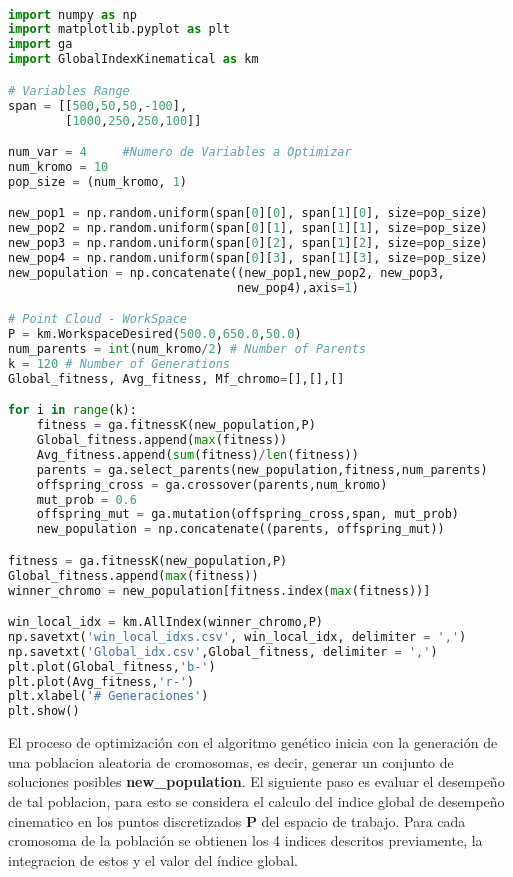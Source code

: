 ~
\begin{lstlisting}[frame=single,language = python]  % Start your code-block
import numpy as np
import matplotlib.pyplot as plt
import ga
import GlobalIndexKinematical as km

# Variables Range
span = [[500,50,50,-100],
        [1000,250,250,100]]

num_var = 4     #Numero de Variables a Optimizar
num_kromo = 10
pop_size = (num_kromo, 1)

new_pop1 = np.random.uniform(span[0][0], span[1][0], size=pop_size)
new_pop2 = np.random.uniform(span[0][1], span[1][1], size=pop_size)
new_pop3 = np.random.uniform(span[0][2], span[1][2], size=pop_size)
new_pop4 = np.random.uniform(span[0][3], span[1][3], size=pop_size)
new_population = np.concatenate((new_pop1,new_pop2, new_pop3,
                                new_pop4),axis=1)

# Point Cloud - WorkSpace
P = km.WorkspaceDesired(500.0,650.0,50.0)
num_parents = int(num_kromo/2) # Number of Parents
k = 120 # Number of Generations
Global_fitness, Avg_fitness, Mf_chromo=[],[],[]

for i in range(k):
    fitness = ga.fitnessK(new_population,P)
    Global_fitness.append(max(fitness))
    Avg_fitness.append(sum(fitness)/len(fitness))
    parents = ga.select_parents(new_population,fitness,num_parents)
    offspring_cross = ga.crossover(parents,num_kromo)
    mut_prob = 0.6
    offspring_mut = ga.mutation(offspring_cross,span, mut_prob)
    new_population = np.concatenate((parents, offspring_mut))

fitness = ga.fitnessK(new_population,P)
Global_fitness.append(max(fitness))
winner_chromo = new_population[fitness.index(max(fitness))]

win_local_idx = km.AllIndex(winner_chromo,P)
np.savetxt('win_local_idxs.csv', win_local_idx, delimiter = ',')
np.savetxt('Global_idx.csv',Global_fitness, delimiter = ',')
plt.plot(Global_fitness,'b-')
plt.plot(Avg_fitness,'r-')
plt.xlabel('# Generaciones')
plt.show()
\end{lstlisting}

El proceso de optimización con el algoritmo genético inicia con la generación de una poblacion aleatoria de cromosomas, es decir, generar un conjunto de soluciones posibles \textbf{new_population}. El siguiente paso es evaluar el desempeño de tal poblacion, para esto se considera el calculo del indice global de desempeño cinematico en los puntos discretizados \textbf{P} del espacio de trabajo. Para cada cromosoma de la población se obtienen los 4 indices descritos previamente, la integracion de estos y el valor del índice global.

